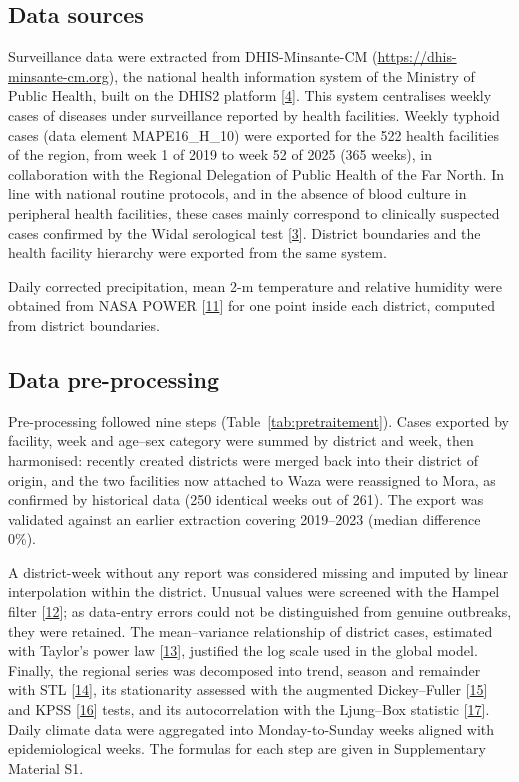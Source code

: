 \documentclass[11pt]{article}
\begin{document}
\subsection{Data sources}
Surveillance data were extracted from DHIS-Minsante-CM (\url{https://dhis-minsante-cm.org}), the national health information system of the Ministry of Public Health, built on the DHIS2 platform [\hyperlink{ref4}{4}]. This system centralises weekly cases of diseases under surveillance reported by health facilities. Weekly typhoid cases (data element MAPE16\_H\_10) were exported for the 522 health facilities of the region, from week 1 of 2019 to week 52 of 2025 (365 weeks), in collaboration with the Regional Delegation of Public Health of the Far North. In line with national routine protocols, and in the absence of blood culture in peripheral health facilities, these cases mainly correspond to clinically suspected cases confirmed by the Widal serological test [\hyperlink{ref3}{3}]. District boundaries and the health facility hierarchy were exported from the same system.

Daily corrected precipitation, mean 2-m temperature and relative humidity were obtained from NASA POWER [\hyperlink{ref11}{11}] for one point inside each district, computed from district boundaries.

\subsection{Data pre-processing}
Pre-processing followed nine steps (Table~\ref{tab:pretraitement}). Cases exported by facility, week and age–sex category were summed by district and week, then harmonised: recently created districts were merged back into their district of origin, and the two facilities now attached to Waza were reassigned to Mora, as confirmed by historical data (250 identical weeks out of 261). The export was validated against an earlier extraction covering 2019–2023 (median difference 0\%).

A district-week without any report was considered missing and imputed by linear interpolation within the district. Unusual values were screened with the Hampel filter [\hyperlink{ref12}{12}]; as data-entry errors could not be distinguished from genuine outbreaks, they were retained. The mean–variance relationship of district cases, estimated with Taylor's power law [\hyperlink{ref13}{13}], justified the log scale used in the global model. Finally, the regional series was decomposed into trend, season and remainder with STL [\hyperlink{ref14}{14}], its stationarity assessed with the augmented Dickey–Fuller [\hyperlink{ref15}{15}] and KPSS [\hyperlink{ref16}{16}] tests, and its autocorrelation with the Ljung–Box statistic [\hyperlink{ref17}{17}]. Daily climate data were aggregated into Monday-to-Sunday weeks aligned with epidemiological weeks. The formulas for each step are given in Supplementary Material S1.
\end{document}
